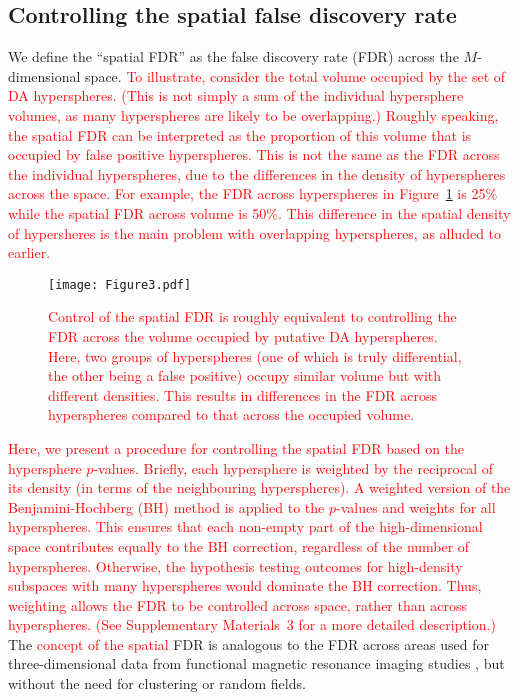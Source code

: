 \documentclass{article}
\newcommand\revised[1]{\textcolor{red}{#1}}
\newcommand{\suppfdr}{3}
\begin{document}
\subsection{Controlling the spatial false discovery rate}
We define the ``spatial FDR'' as the false discovery rate (FDR) across the $M$-dimensional space.
\revised{To illustrate, consider the total volume occupied by the set of DA hyperspheres.
    (This is not simply a sum of the individual hypersphere volumes, as many hyperspheres are likely to be overlapping.)
    Roughly speaking, the spatial FDR can be interpreted as the proportion of this volume that is occupied by false positive hyperspheres.
    This is not the same as the FDR across the individual hyperspheres, due to the differences in the density of hyperspheres across the space.
    For example, the FDR across hyperspheres in Figure~\ref{fig:fdrexample} is 25\% while the spatial FDR across volume is 50\%.
    This difference in the spatial density of hypersheres is the main problem with overlapping hyperspheres, as alluded to earlier.}

\begin{figure}[bt]
\begin{center}
\texttt{[image: Figure3.pdf]}
\end{center}
\caption{\revised{Control of the spatial FDR is roughly equivalent to controlling the FDR across the volume occupied by putative DA hyperspheres.
    Here, two groups of hyperspheres (one of which is truly differential, the other being a false positive) occupy similar volume but with different densities.
This results in differences in the FDR across hyperspheres compared to that across the occupied volume.
}}
\label{fig:fdrexample}
\end{figure}

\revised{Here, we present a procedure for controlling the spatial FDR based on the hypersphere $p$-values.
    Briefly, each hypersphere is weighted by the reciprocal of its density (in terms of the neighbouring hyperspheres).
    A weighted version of the Benjamini-Hochberg (BH) method is applied to the $p$-values and weights for all hyperspheres.
    This ensures that each non-empty part of the high-dimensional space contributes equally to the BH correction, regardless of the number of hyperspheres.
    Otherwise, the hypothesis testing outcomes for high-density subspaces with many hyperspheres would dominate the BH correction.
    Thus, weighting allows the FDR to be controlled across space, rather than across hyperspheres.
    (See Supplementary Materials~\suppfdr{} for a more detailed description.)}
    The \revised{concept of the spatial} FDR is analogous to the FDR across areas used for three-dimensional data from functional magnetic resonance imaging studies \cite{pacifico2004false,benjamini2007false}, but without the need for clustering or random fields.
\end{document}
